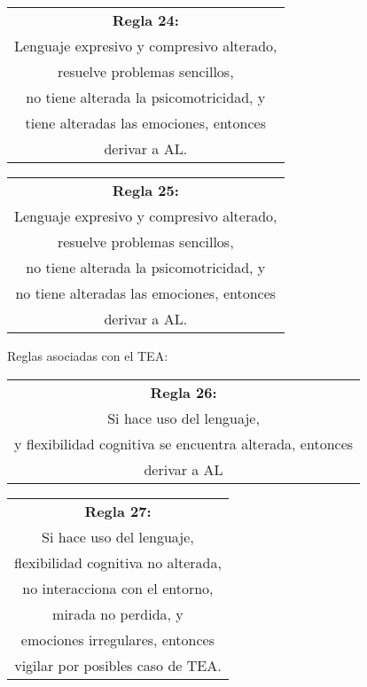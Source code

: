 \documentclass[letterpaper,12pt]{article}
\begin{document}
\begin{center}
	\begin{tabular}{|c|}
		\hline 
		\textbf{Regla 24:} \\
		Lenguaje expresivo y compresivo alterado,\\
		resuelve problemas sencillos,\\
		no tiene alterada la psicomotricidad, y\\
		tiene alteradas las emociones, entonces\\
		derivar a AL.\\
	\hline 
\end{tabular} 
\end{center}	
		
\begin{center}
	\begin{tabular}{|c|}
		\hline 
		\textbf{Regla 25:} \\
		Lenguaje expresivo y compresivo alterado, \\
		resuelve problemas sencillos,\\
		no tiene alterada la psicomotricidad, y\\
		no tiene alteradas las emociones, entonces \\
		derivar a AL. \\
	\hline 
\end{tabular} 
\end{center}	

Reglas asociadas con el TEA:
\begin{center}
	\begin{tabular}{|c|}
		\hline 
		\textbf{Regla 26:} \\
		Si hace uso del lenguaje,\\
		y flexibilidad cognitiva se encuentra alterada, entonces\\
		derivar a AL\\
	\hline 
\end{tabular} 
\end{center}	
		
\begin{center}
	\begin{tabular}{|c|}
		\hline 
		\textbf{Regla 27:} \\
		Si hace uso del lenguaje,\\
		flexibilidad cognitiva no alterada,\\
		no interacciona con el entorno,\\
		mirada no perdida, y\\
		emociones irregulares, entonces\\
		vigilar por posibles caso de TEA.\\
	\hline 
\end{tabular} 
\end{center}
	
\end{document}

